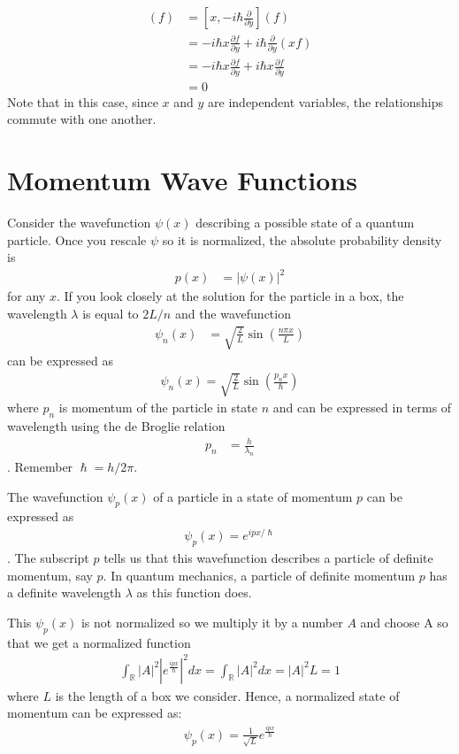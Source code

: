 \documentclass[book.tex]{subfiles}
\begin{document}
\begin{align}
    [x_1, p_2](f) &= [x, -i \hbar \frac{\partial}{\partial y}](f) \\
    &= -i \hbar x \frac{\partial f}{\partial y} + i \hbar \frac{\partial}{\partial y} \left (x f \right ) \\
    &= -i \hbar x \frac{\partial f}{\partial y} + i \hbar x \frac{\partial f}{\partial y} \\
    &= 0
\end{align}
Note that in this case, since $x$ and $y$ are independent variables, the relationships commute with one another.

\section{Momentum Wave Functions}

Consider the wavefunction $\psi(x)$ describing a possible state of a quantum particle.
Once you rescale $\psi$ so it is normalized, the absolute probability density is 
\begin{align}
p(x) &= |\psi(x)|^2
\end{align}
for any $x$. If you look closely at the solution for the particle in a box, the wavelength $\lambda$ is equal to $2L/n$ and the wavefunction 
\begin{align}
\psi_n(x) &=\sqrt{\frac{2}{L}} \sin\left (\frac{n \pi x}{L}\right )
\end{align}
can be expressed as  
\begin{align}
\psi_n(x) = \sqrt{\frac{2}{L}}\sin \left( \frac{ p_nx}{\hslash}\right)
\end{align}
where $p_n$ is momentum of the particle in state $n$ and can be expressed in terms of wavelength using the de Broglie relation \begin{align}
p_n &= \frac{h}{\lambda_n}
\end{align}. 
Remember $\hslash = h/2\pi$. 

The wavefunction $\psi_p(x)$ of a particle in a state of momentum $p$ can be expressed as \begin{align}
\psi_p(x)=e^{ip x/\hslash}
\end{align}. The subscript $p$ tells us that this wavefunction describes a particle of definite momentum, say $p$. In quantum mechanics, a particle of definite momentum $p$ has a definite wavelength $\lambda$ as this function does.

This $\psi_p(x)$ is not normalized so we multiply it by a number $A$ and choose A so that we get a normalized function
\begin{align}
\int_{\mathbb{R}}|A|^2|e^{\frac{ipx}{\hslash}}|^2dx=\int_{\mathbb{R}}|A|^2dx=|A|^2L=1
\end{align}
where $L$ is the length of a box we consider. Hence, a normalized state of momentum can be expressed as:
\begin{align}
\psi_p(x)=\frac{1}{\sqrt{L}}e^{\frac{ipx}{\hslash}}
\end{align}
\end{document}
